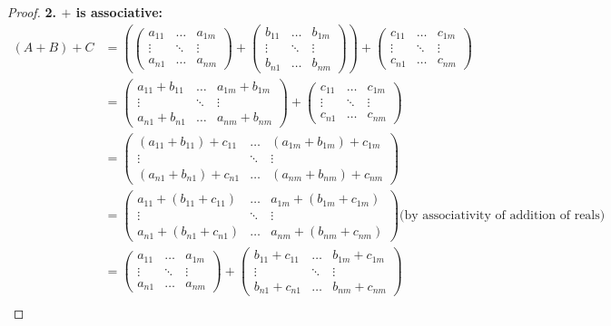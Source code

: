 \documentclass{article}
\begin{document}
\begin{proof}
\textbf{2. $+$ is associative:}
\begin{align*}
(A + B) + C &= (\begin{pmatrix} a_{11} & \ldots & a_{1m} \\ \vdots &  \ddots & \vdots \\ a_{n1} &  \ldots & a_{nm} \end{pmatrix} +  \begin{pmatrix} b_{11} &  \ldots & b_{1m} \\  \vdots & \ddots & \vdots \\ b_{n1} &  \ldots & b_{nm} \end{pmatrix}) + \begin{pmatrix} c_{11} &  \ldots & c_{1m} \\ \vdots & \ddots & \vdots \\ c_{n1} & \ldots & c_{nm} \end{pmatrix} \\
&= \begin{pmatrix} a_{11} + b_{11} & \ldots & a_{1m} + b_{1m} \\ \vdots & \ddots & \vdots \\ a_{n1} + b_{n1} & \ldots & a_{nm} + b_{nm} \end{pmatrix} + \begin{pmatrix} c_{11} &  \ldots & c_{1m}  \\ \vdots & \ddots & \vdots \\ c_{n1} & \ldots & c_{nm} \end{pmatrix} \\
&= \begin{pmatrix} (a_{11} + b_{11}) + c_{11} & \ldots & (a_{1m} + b_{1m}) + c_{1m} \\  \vdots & \ddots & \vdots \\ (a_{n1} + b_{n1}) + c_{n1} & \ldots & (a_{nm} + b_{nm}) + c_{nm} \end{pmatrix} \\
&= \begin{pmatrix} a_{11} + (b_{11} + c_{11}) & \ldots & a_{1m} + (b_{1m} + c_{1m}) \\  \vdots & \ddots & \vdots \\ a_{n1} + (b_{n1} + c_{n1}) & \ldots & a_{nm} + (b_{nm} + c_{nm}) \end{pmatrix} \text{(by associativity of addition of reals)} \\
&= \begin{pmatrix} a_{11} & \ldots & a_{1m} \\ \vdots &  \ddots & \vdots \\ a_{n1} &  \ldots & a_{nm} \end{pmatrix} + \begin{pmatrix} b_{11} + c_{11} &  \ldots & b_{1m} + c_{1m} \\  \vdots & \ddots & \vdots \\ b_{n1} +c_{n1} &  \ldots & b_{nm} + c_{nm} \end{pmatrix} \\

\end{align*}
\end{proof}
\end{document}
